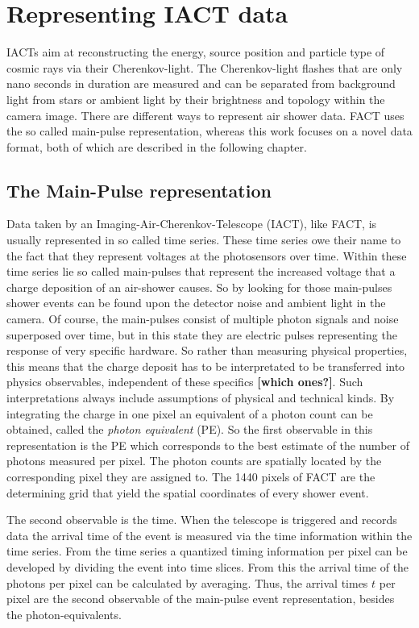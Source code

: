 \chapter{Representing IACT data}
%
IACTs aim at reconstructing the energy, source position and particle type of
cosmic rays via their Cherenkov-light. The Cherenkov-light flashes that are
only nano seconds in duration are measured and can be separated from background
light from stars or ambient light by their brightness and topology within the
camera image. There are different ways to represent air shower data. FACT uses
the so called main-pulse representation, whereas this work focuses on a novel
data format, both of which are described in the following chapter.

\section{The Main-Pulse representation}
%
Data taken by an Imaging-Air-Cherenkov-Telescope
(IACT), like FACT, is usually represented in so called time series.
These time series owe their name to the fact that they represent voltages at the photosensors over time. Within these time series lie so called main-pulses that represent the increased voltage that a charge deposition of an air-shower causes. So by looking for those main-pulses shower events can be found upon the detector noise and ambient light in the camera. Of course, the main-pulses consist of multiple photon signals and noise superposed over time, but in this state they are electric pulses representing the response of very specific hardware. So rather than measuring physical properties, this means that the charge deposit has to be interpretated to be transferred into physics observables, independent of these specifics \textbf{[which ones?]}. Such interpretations always include assumptions of physical and technical kinds. By integrating the charge in one pixel an equivalent of a photon count can be obtained, called the \textit{photon equivalent} (PE). So the first observable in this representation is the PE which corresponds to the best estimate of the number of photons measured per pixel. The photon counts are spatially located by the corresponding pixel they are assigned to. The 1440 pixels of FACT are the determining grid that yield the spatial coordinates of every shower event.

The second observable is the time. When the telescope is triggered and records
data the arrival time of the event is measured via the time information within
the time series. From the time series a quantized timing information per pixel
can be developed by dividing the event into time slices. From this the arrival
time of the photons per pixel can be calculated by averaging. Thus, the arrival
times $t$ per pixel are the second observable of the main-pulse event
representation, besides the photon-equivalents.

